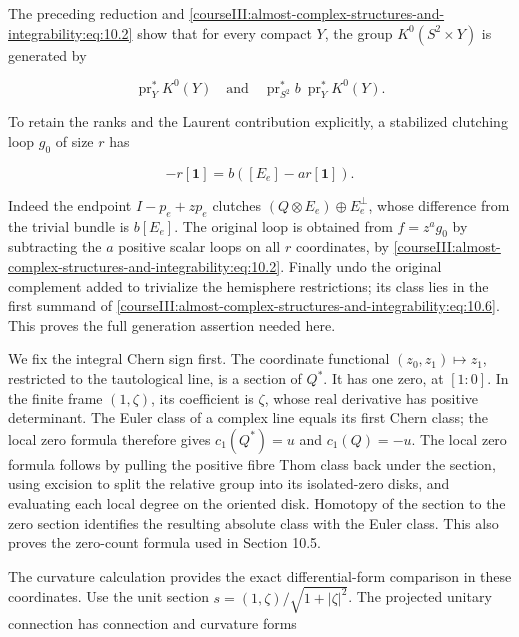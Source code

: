The preceding reduction and \eqref{courseIII:almost-complex-structures-and-integrability:eq:10.2} show that for every compact \(Y\), the group \(K^0(S^2\times Y)\) is generated by

\begin{equation}
\operatorname{pr}_Y^*K^0(Y)
\quad\text{and}\quad
\operatorname{pr}_{S^2}^*b\ \operatorname{pr}_Y^*K^0(Y).
\label{courseIII:almost-complex-structures-and-integrability:eq:10.6}
\end{equation}

To retain the ranks and the Laurent contribution explicitly, a stabilized clutching loop \(g_0\) of size \(r\) has

\begin{equation}
[T_{g_0}]-r[\mathbf1]
=b\left([E_e]-ar[\mathbf1]\right).
\label{courseIII:almost-complex-structures-and-integrability:eq:10.7}
\end{equation}

Indeed the endpoint \(I-p_e+zp_e\) clutches \((Q\otimes E_e)\oplus E_e^\perp\), whose difference from the trivial bundle is \(b[E_e]\). The original loop is obtained from \(f=z^ag_0\) by subtracting the \(a\) positive scalar loops on all \(r\) coordinates, by \eqref{courseIII:almost-complex-structures-and-integrability:eq:10.2}. Finally undo the original complement added to trivialize the hemisphere restrictions; its class lies in the first summand of \eqref{courseIII:almost-complex-structures-and-integrability:eq:10.6}. This proves the full generation assertion needed here.

We fix the integral Chern sign first. The coordinate functional \((z_0,z_1)\mapsto z_1\), restricted to the tautological line, is a section of \(Q^*\). It has one zero, at \([1:0]\). In the finite frame \((1,\zeta)\), its coefficient is \(\zeta\), whose real derivative has positive determinant. The Euler class of a complex line equals its first Chern class; the local zero formula therefore gives \(c_1(Q^*)=u\) and \(c_1(Q)=-u\). The local zero formula follows by pulling the positive fibre Thom class back under the section, using excision to split the relative group into its isolated-zero disks, and evaluating each local degree on the oriented disk. Homotopy of the section to the zero section identifies the resulting absolute class with the Euler class. This also proves the zero-count formula used in Section 10.5.

The curvature calculation provides the exact differential-form comparison in these coordinates. Use the unit section \(s=(1,\zeta)/\sqrt{1+|\zeta|^2}\). The projected unitary connection has connection and curvature forms

